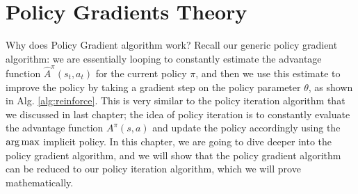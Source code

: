 \chapter{Policy Gradients Theory}
Why does Policy Gradient algorithm work? Recall our generic policy gradient algorithm: we are essentially looping to constantly estimate the advantage function $\hat{A}^\pi(s_t,a_t)$ for the current policy $\pi$, and then we use this estimate to improve the policy by taking a gradient step on the policy parameter $\theta$, as shown in Alg. \ref{alg:reinforce}. This is very similar to the policy iteration algorithm that we discussed in last chapter; the idea of policy iteration is to constantly evaluate the advantage function $A^\pi(s,a)$ and update the policy accordingly using the $\operatorname*{arg\,max}$ implicit policy. In this chapter, we are going to dive deeper into the policy gradient algorithm, and we will show that the policy gradient algorithm can be reduced to our policy iteration algorithm, which we will prove mathematically. 

